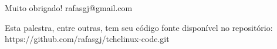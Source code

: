 \documentclass[aspectratio=43,14pt]{beamer}
\begin{document}
{%
\usebackgroundtemplate{ }
\begin{frame}
    
    \vfill
    \huge Muito obrigado!
    \vfill
    \large rafasgj@gmail.com
    \vfill

\end{frame}
}

\begin{frame}
\begin{center}
    \vfill
    Esta palestra, entre outras, tem seu código fonte disponível no repositório:
    \vfill
    https://github.com/rafasgj/tchelinux-code.git
    \vfill
\end{center}
\end{frame}
\end{document}
